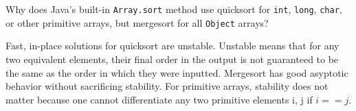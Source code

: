 \question Why does Java's built-in \lstinline$Array.sort$ method use quicksort
for \lstinline$int$, \lstinline$long$, \lstinline$char$, or other primitive
arrays, but mergesort for all \lstinline$Object$ arrays?

\begin{solution}[1in]
Fast, in-place solutions for quicksort are unstable. Unstable means that for any two equivalent elements, their final order in the output is not guaranteed to be the same as the order in which they were inputted. Mergesort has good asyptotic behavior without sacrificing stability. For primitive arrays, stability does not matter because one cannot differentiate any two primitive elements i, j if $i == j$. 
\end{solution}

